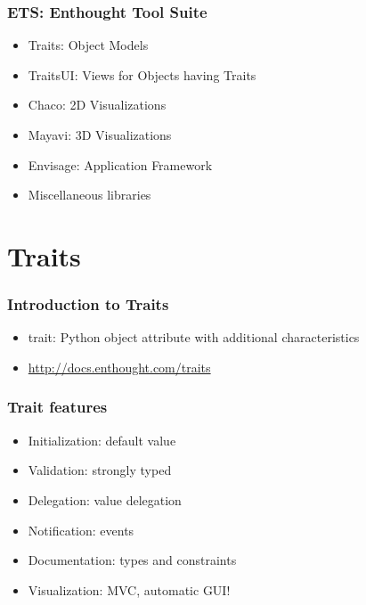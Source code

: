 \documentclass[14pt,compress]{beamer}
\begin{document}
\begin{frame}
  \frametitle{ETS: Enthought Tool Suite}
  \begin{itemize}
    \item Traits: Object Models
    \item TraitsUI: Views for Objects having Traits
    \item Chaco: 2D Visualizations
    \item Mayavi: 3D Visualizations
    \item Envisage: Application Framework
    \vspace*{0.5in}
    \item Miscellaneous libraries
  \end{itemize}
\end{frame}



\section{Traits}

\begin{frame}
  \frametitle{Introduction to Traits}
  \begin{itemize}
    \item  \alert{trait}: Python object attribute with additional characteristics
    \vspace*{2em}

    \item \url{http://docs.enthought.com/traits}

  \end{itemize}
\end{frame}

\begin{frame}
  \frametitle{Trait features}
  \begin{itemize}
    \item Initialization: default value
    \item Validation: strongly typed
    \item Delegation: value delegation
    \item Notification: events
    \item Documentation: types and constraints
    \item Visualization: MVC, automatic GUI!
  \end{itemize}
\end{frame}
\end{document}

